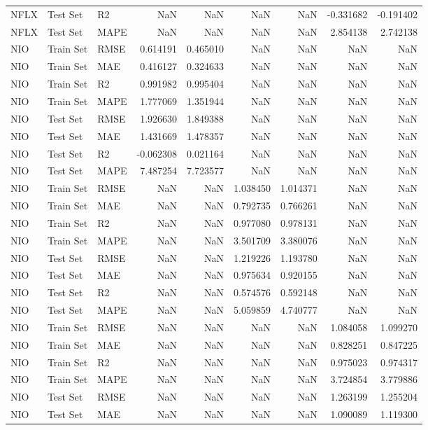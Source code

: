 \begin{tabular}{lllrrrrrr}
NFLX & Test Set & R2 & NaN & NaN & NaN & NaN & -0.331682 & -0.191402 \\
NFLX & Test Set & MAPE & NaN & NaN & NaN & NaN & 2.854138 & 2.742138 \\
NIO & Train Set & RMSE & 0.614191 & 0.465010 & NaN & NaN & NaN & NaN \\
NIO & Train Set & MAE & 0.416127 & 0.324633 & NaN & NaN & NaN & NaN \\
NIO & Train Set & R2 & 0.991982 & 0.995404 & NaN & NaN & NaN & NaN \\
NIO & Train Set & MAPE & 1.777069 & 1.351944 & NaN & NaN & NaN & NaN \\
NIO & Test Set & RMSE & 1.926630 & 1.849388 & NaN & NaN & NaN & NaN \\
NIO & Test Set & MAE & 1.431669 & 1.478357 & NaN & NaN & NaN & NaN \\
NIO & Test Set & R2 & -0.062308 & 0.021164 & NaN & NaN & NaN & NaN \\
NIO & Test Set & MAPE & 7.487254 & 7.723577 & NaN & NaN & NaN & NaN \\
NIO & Train Set & RMSE & NaN & NaN & 1.038450 & 1.014371 & NaN & NaN \\
NIO & Train Set & MAE & NaN & NaN & 0.792735 & 0.766261 & NaN & NaN \\
NIO & Train Set & R2 & NaN & NaN & 0.977080 & 0.978131 & NaN & NaN \\
NIO & Train Set & MAPE & NaN & NaN & 3.501709 & 3.380076 & NaN & NaN \\
NIO & Test Set & RMSE & NaN & NaN & 1.219226 & 1.193780 & NaN & NaN \\
NIO & Test Set & MAE & NaN & NaN & 0.975634 & 0.920155 & NaN & NaN \\
NIO & Test Set & R2 & NaN & NaN & 0.574576 & 0.592148 & NaN & NaN \\
NIO & Test Set & MAPE & NaN & NaN & 5.059859 & 4.740777 & NaN & NaN \\
NIO & Train Set & RMSE & NaN & NaN & NaN & NaN & 1.084058 & 1.099270 \\
NIO & Train Set & MAE & NaN & NaN & NaN & NaN & 0.828251 & 0.847225 \\
NIO & Train Set & R2 & NaN & NaN & NaN & NaN & 0.975023 & 0.974317 \\
NIO & Train Set & MAPE & NaN & NaN & NaN & NaN & 3.724854 & 3.779886 \\
NIO & Test Set & RMSE & NaN & NaN & NaN & NaN & 1.263199 & 1.255204 \\
NIO & Test Set & MAE & NaN & NaN & NaN & NaN & 1.090089 & 1.119300 \\

\end{tabular}
